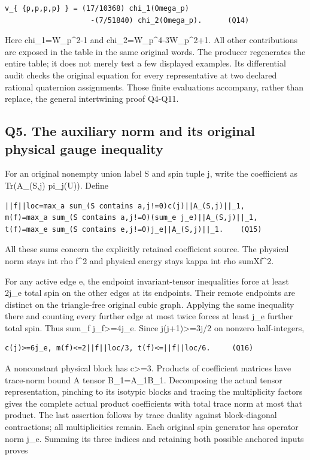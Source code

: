 \documentclass[11pt,a4paper]{article}
\newcounter{none}
\renewcommand{\[}{\begingroup\small\originaldisplaystart}
\renewcommand{\]}{\originaldisplayend\endgroup}
\begin{document}
\begin{verbatim}
v_{ {p,p,p,p} } = (17/10368) chi_1(Omega_p)
                    -(7/51840) chi_2(Omega_p).      (Q14)
\end{verbatim}

Here chi\_1=W\_p\^{}2-1 and chi\_2=W\_p\^{}4-3W\_p\^{}2+1. All other
contributions are exposed in the table in the same original words. The
producer regenerates the entire table; it does not merely test a few
displayed examples. Its differential audit checks the original equation
for every representative at two declared rational quaternion
assignments. Those finite evaluations accompany, rather than replace,
the general intertwining proof Q4-Q11.

\subsection{Q5. The auxiliary norm and its original physical gauge
inequality}\label{q5.-the-auxiliary-norm-and-its-original-physical-gauge-inequality}

For an original nonempty union label S and spin tuple j, write the
coefficient as Tr(A\_(S,j) pi\_j(U)). Define

\begin{verbatim}
||f||loc=max_a sum_(S contains a,j!=0)c(j)||A_(S,j)||_1,
m(f)=max_a sum_(S contains a,j!=0)(sum_e j_e)||A_(S,j)||_1,
t(f)=max_e sum_(S contains e,j!=0)j_e||A_(S,j)||_1.    (Q15)
\end{verbatim}

All these sums concern the explicitly retained coefficient source. The
physical norm stays int rho \textbar f\textbar\^{}2 and physical energy
stays kappa int rho sum\textbar Xf\textbar\^{}2.

For any active edge e, the endpoint invariant-tensor inequalities force
at least 2j\_e total spin on the other edges at its endpoints. Their
remote endpoints are distinct on the triangle-free original cubic graph.
Applying the same inequality there and counting every further edge at
most twice forces at least j\_e further total spin. Thus sum\_f
j\_f\textgreater=4j\_e. Since j(j+1)\textgreater=3j/2 on nonzero
half-integers,

\begin{verbatim}
c(j)>=6j_e, m(f)<=2||f||loc/3, t(f)<=||f||loc/6.     (Q16)
\end{verbatim}

A nonconstant physical block has c\textgreater=3. Products of
coefficient matrices have trace-norm bound \textbar\textbar A tensor
B\textbar\textbar\_1=\textbar\textbar A\textbar\textbar\_1\textbar\textbar B\textbar\textbar\_1.
Decomposing the actual tensor representation, pinching to its isotypic
blocks and tracing the multiplicity factors gives the complete actual
product coefficients with total trace norm at most that product. The
last assertion follows by trace duality against block-diagonal
contractions; all multiplicities remain. Each original spin generator
has operator norm j\_e. Summing its three indices and retaining both
possible anchored inputs proves
\end{document}

